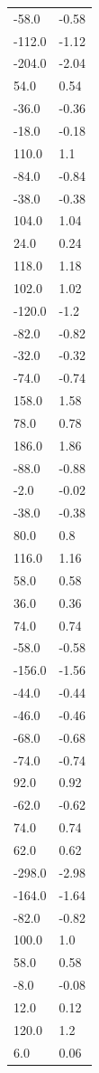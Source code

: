 \begin{longtable}{ll}
-58.0 & -0.58 \\
-112.0 & -1.12 \\
-204.0 & -2.04 \\
54.0 & 0.54 \\
-36.0 & -0.36 \\
-18.0 & -0.18 \\
110.0 & 1.1 \\
-84.0 & -0.84 \\
-38.0 & -0.38 \\
104.0 & 1.04 \\
24.0 & 0.24 \\
118.0 & 1.18 \\
102.0 & 1.02 \\
-120.0 & -1.2 \\
-82.0 & -0.82 \\
-32.0 & -0.32 \\
-74.0 & -0.74 \\
158.0 & 1.58 \\
78.0 & 0.78 \\
186.0 & 1.86 \\
-88.0 & -0.88 \\
-2.0 & -0.02 \\
-38.0 & -0.38 \\
80.0 & 0.8 \\
116.0 & 1.16 \\
58.0 & 0.58 \\
36.0 & 0.36 \\
74.0 & 0.74 \\
-58.0 & -0.58 \\
-156.0 & -1.56 \\
-44.0 & -0.44 \\
-46.0 & -0.46 \\
-68.0 & -0.68 \\
-74.0 & -0.74 \\
92.0 & 0.92 \\
-62.0 & -0.62 \\
74.0 & 0.74 \\
62.0 & 0.62 \\
-298.0 & -2.98 \\
-164.0 & -1.64 \\
-82.0 & -0.82 \\
100.0 & 1.0 \\
58.0 & 0.58 \\
-8.0 & -0.08 \\
12.0 & 0.12 \\
120.0 & 1.2 \\
6.0 & 0.06 \\

\end{longtable}
